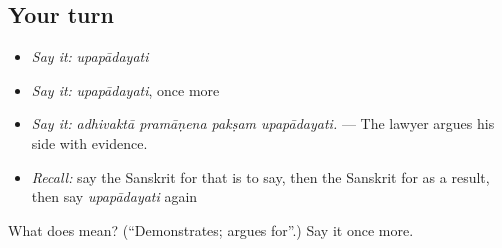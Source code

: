 \subsection*{Your turn}
\begin{itemize}
\raggedright
  \item \emph{Say it:} \emph{upapādayati}
  \item \emph{Say it:} \emph{upapādayati}, once more
  \item \emph{Say it:} \emph{adhivaktā pramāṇena pakṣam upapādayati.} — The lawyer argues his side with evidence.
  \item \emph{Recall:} say the Sanskrit for that is to say, then the Sanskrit for as a result, then say \emph{upapādayati} again
\end{itemize}

\begin{tcolorbox}[breakable,colback=teal!4,colframe=teal!35!black,title={Before you move on}]
What does  mean? (\textquotedblleft{}Demonstrates; argues for\textquotedblright{}.) Say it once more.
\end{tcolorbox}
